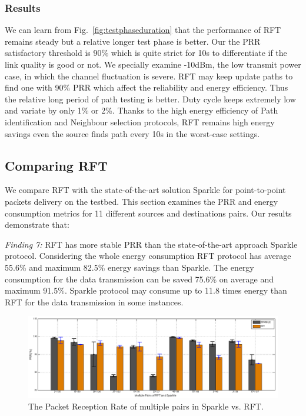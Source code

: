 \documentclass[conference]{IEEEtran}
\begin{document}
\subsubsection{Results}
We can learn from Fig.~\ref{fig:testphaseduration} that the performance of RFT remains steady but a relative longer test phase is better.  Our the PRR satisfactory threshold is 90\% which is quite strict for 10s to differentiate if the link quality is good or not. We specially examine -10dBm, the low transmit power case, in which the channel fluctuation is severe. RFT may keep update paths to find one with 90\% PRR which affect the reliability and energy efficiency. Thus the relative long period of path testing is better. Duty cycle keeps extremely low and variate by only 1\% or 2\%. Thanks to the high energy efficiency of Path identification and Neighbour selection protocols, RFT remains high energy savings even the source finds path every 10s in the worst-case settings.  

\subsection{Comparing RFT}
\label{sec:ComparingReinforcements}
We compare RFT with the state-of-the-art solution Sparkle for point-to-point packets delivery on the testbed. This section examines the PRR and energy consumption metrics for 11 different sources and destinations pairs. Our results demonstrate that:

\emph{Finding 7:} 
RFT has more stable PRR than the state-of-the-art approach Sparkle protocol. Considering the whole energy consumption RFT protocol has average 55.6\% and maximum 82.5\% energy savings than Sparkle. The energy consumption for the data transmission can be saved 75.6\% on average and maximum 91.5\%. Sparkle protocol may consume up to 11.8 times energy than RFT for the data transmission in some instances. 
\begin{figure}
\centering
\includegraphics[width=16cm]{groupbar_prr_rft_spkl.png}
\caption{The Packet Reception Rate of multiple pairs in Sparkle vs. RFT.}
\label{fig:PRRcompare}
\end{figure}
\end{document}
